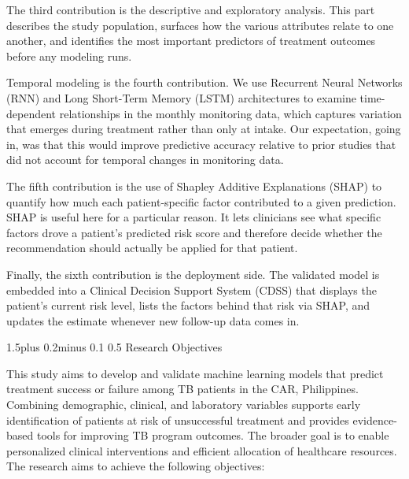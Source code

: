\documentclass[12pt]{article}
\makeatletter
\renewcommand{\_}{\textunderscore\allowbreak}
\renewcommand{\subsection}{\@startsection{subsection}{2}{0pt}%
  {1.5\baselineskip plus 0.2\baselineskip minus 0.1\baselineskip}%
  {0.5\baselineskip}%
  {\bfseries\normalsize}}
\makeatother
\begin{document}
The third contribution is the descriptive and exploratory analysis. This part describes the study population, surfaces how the various attributes relate to one another, and identifies the most important predictors of treatment outcomes before any modeling runs.

Temporal modeling is the fourth contribution. We use Recurrent Neural Networks (RNN) and Long Short-Term Memory (LSTM) architectures to examine time-dependent relationships in the monthly monitoring data, which captures variation that emerges during treatment rather than only at intake. Our expectation, going in, was that this would improve predictive accuracy relative to prior studies that did not account for temporal changes in monitoring data.

The fifth contribution is the use of Shapley Additive Explanations (SHAP) to quantify how much each patient-specific factor contributed to a given prediction. SHAP is useful here for a particular reason. It lets clinicians see what specific factors drove a patient's predicted risk score and therefore decide whether the recommendation should actually be applied for that patient.

Finally, the sixth contribution is the deployment side. The validated model is embedded into a Clinical Decision Support System (CDSS) that displays the patient's current risk level, lists the factors behind that risk via SHAP, and updates the estimate whenever new follow-up data comes in.

\subsection{Research Objectives}

This study aims to develop and validate machine learning models that predict treatment success or failure among TB patients in the CAR, Philippines. Combining demographic, clinical, and laboratory variables supports early identification of patients at risk of unsuccessful treatment and provides evidence-based tools for improving TB program outcomes. The broader goal is to enable personalized clinical interventions and efficient allocation of healthcare resources. The research aims to achieve the following objectives:
\end{document}
